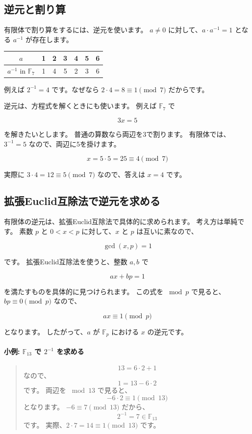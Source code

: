 \documentclass[a4paper,11pt]{ltjsarticle}
\newcommand{\F}{\mathbb{F}}
\newenvironment{examplebox}[1]{%
  \paragraph*{#1}\begin{quote}
}{%
  \end{quote}
}
\begin{document}
\subsection{逆元と割り算}

有限体で割り算をするには、逆元を使います。
\(a \neq 0\) に対して、\(a \cdot a^{-1} = 1\) となる \(a^{-1}\) が存在します。

\begin{center}
\begin{tabular}{@{}ccccccc@{}}
\toprule
\(a\) & 1 & 2 & 3 & 4 & 5 & 6 \\
\midrule
\(a^{-1}\) in \(\F_7\) & 1 & 4 & 5 & 2 & 3 & 6 \\
\bottomrule
\end{tabular}
\end{center}

例えば \(2^{-1}=4\) です。なぜなら \(2 \cdot 4 = 8 \equiv 1 \pmod{7}\) だからです。

逆元は、方程式を解くときにも使います。
例えば \(\F_7\) で

\[
  3x = 5
\]

を解きたいとします。
普通の算数なら両辺を3で割ります。
有限体では、\(3^{-1}=5\) なので、両辺に5を掛けます。

\[
  x = 5\cdot 5 = 25 \equiv 4 \pmod{7}
\]

実際に \(3\cdot4=12\equiv5\pmod{7}\) なので、答えは \(x=4\) です。

\subsection{拡張Euclid互除法で逆元を求める}

有限体の逆元は、拡張Euclid互除法で具体的に求められます。
考え方は単純です。
素数 \(p\) と \(0<x<p\) に対して、\(x\) と \(p\) は互いに素なので、

\[
  \gcd(x,p)=1
\]

です。
拡張Euclid互除法を使うと、整数 \(a,b\) で

\[
  ax+bp=1
\]

を満たすものを具体的に見つけられます。
この式を \(\bmod p\) で見ると、\(bp\equiv0\pmod p\) なので、

\[
  ax\equiv1\pmod p
\]

となります。
したがって、\(a\) が \(\F_p\) における \(x\) の逆元です。

\begin{examplebox}{小例: \(\F_{13}\) で \(2^{-1}\) を求める}
\[
  13 = 6\cdot2+1
\]
なので、
\[
  1=13-6\cdot2
\]
です。
両辺を \(\bmod 13\) で見ると、
\[
  -6\cdot2\equiv1\pmod{13}
\]
となります。
\(-6\equiv7\pmod{13}\) だから、
\[
  2^{-1}=7 \in \F_{13}
\]
です。
実際、\(2\cdot7=14\equiv1\pmod{13}\) です。
\end{examplebox}
\end{document}
